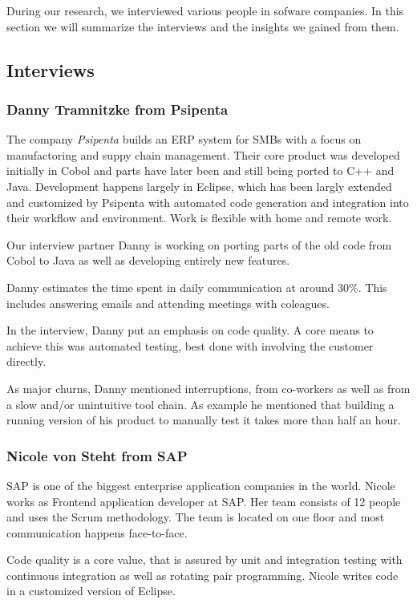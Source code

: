 During our research, we interviewed various people in sofware companies. In this section we will summarize the interviews and the insights we gained from them.

\subsection{Interviews}
\subsubsection{Danny Tramnitzke from Psipenta}
The company \emph{Psipenta} builds an ERP system for SMBs with a focus on manufactoring and suppy chain management. Their core product was developed initially in Cobol and parts have later been and still being ported to C++ and Java. Development happens largely in Eclipse, which has been largly extended and customized by Psipenta with automated code generation and integration into their workflow and environment. Work is flexible with home and remote work.

Our interview partner Danny is working on porting parts of the old code from Cobol to Java as well as developing entirely new features.

Danny estimates the time spent in daily communication at around 30\%. This includes answering emails and attending meetings with coleagues.

In the interview, Danny put an emphasis on code quality. A core means to achieve this was automated testing, best done with involving the customer directly.

As major churns, Danny mentioned interruptions, from co-workers as well as from a slow and/or unintuitive tool chain. As example he mentioned that building a running version of his product to manually test it takes more than half an hour.

\subsubsection{Nicole von Steht from SAP}
SAP is one of the biggest enterprise application companies in the world. Nicole works as Frontend application developer at SAP. Her team consists of 12 people and uses the Scrum methodology. The team is located on one floor and most communication happens face-to-face.

Code quality is a core value, that is assured by unit and integration testing with continuous integration as well as rotating pair programming. Nicole writes code in a customized version of Eclipse.

